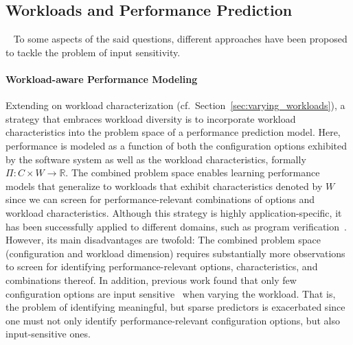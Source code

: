 {\subsection{Workloads and Performance Prediction} ~\label{sec:strategies}
To some aspects of the said questions, different approaches have been proposed to tackle the problem of input sensitivity.

\paragraph{Workload-aware Performance Modeling}\label{sec:workload-aware}
Extending on workload characterization (cf.~Section~\ref{sec:varying_workloads}), a strategy that embraces workload diversity is to incorporate workload characteristics into the problem space of a performance prediction model. Here, performance is modeled as a function of both the configuration options exhibited by the software system as well as the workload characteristics, formally $\Pi: C \times W \rightarrow \mathbb{R}$.
The combined problem space enables learning performance models that generalize to workloads that exhibit characteristics denoted by $W$ since we can screen for performance-relevant combinations of options and workload characteristics. Although this strategy is highly application-specific, it has been successfully applied to different domains, such as program verification~\cite{koc_satune_2021}. However, its main disadvantages are twofold: The combined problem space (configuration and workload dimension) requires substantially more observations to screen for identifying performance-relevant options, characteristics, and combinations thereof. In addition, previous work  found that  only few configuration options are input sensitive~\cite{jamishidi_transfer_2017} when varying the workload. That is, the problem of identifying meaningful, but sparse predictors is exacerbated since one must not only identify performance-relevant configuration options, but also input-sensitive ones.

}
